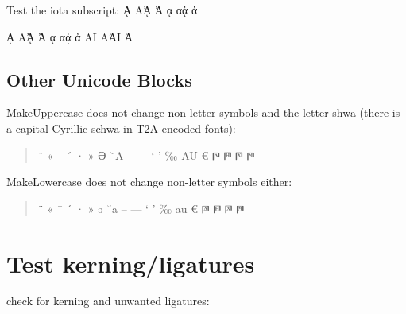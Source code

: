 \documentclass[a4paper]{article}
\begin{document}
\textlatin{Test the iota subscript:}
\textAlpha\prosgegrammeni ᾼ Α\prosgegrammeni  ᾈ Ἀ\prosgegrammeni 
\MakeLowercase{\textAlpha\prosgegrammeni ᾼ Α\prosgegrammeni  ᾈ
					Ἀ\prosgegrammeni}

\textAlpha\ypogegrammeni ᾼ Α\ypogegrammeni  ᾈ Ἀ\ypogegrammeni 
\MakeLowercase{\textAlpha\ypogegrammeni ᾼ Α\ypogegrammeni  ᾈ
					Ἀ\ypogegrammeni}
\MakeUppercase{\textAlpha\ypogegrammeni ᾼ Α\ypogegrammeni  ᾈ
					Ἀ\ypogegrammeni}



\subsection{Other Unicode Blocks}

MakeUppercase does not change non-letter symbols and the letter shwa
(there is a capital Cyrillic schwa in T2A encoded fonts):
\begin{quote}
  \greekscript
  \MakeUppercase{¨ « ¯ ´ · »}
  \MakeUppercase{ə}
  \MakeUppercase{˘a}
  \MakeUppercase{– — ‘ ’ ‰ a‌u}
  \MakeUppercase{€}
  \MakeUppercase{
  𐅄 %
  𐅅 %
  𐅆 %
  𐅇 %
  }
\end{quote}
MakeLowercase does not change non-letter symbols either:
\begin{quote}
  \greekscript
  \MakeLowercase{¨ « ¯ ´ · »}
  \MakeLowercase{ə}
  \MakeLowercase{˘A}
  \MakeLowercase{– — ‘ ’ ‰ A‌‌U}
  \MakeLowercase{€}
  \MakeLowercase{
  𐅄 %
  𐅅 %
  𐅆 %
  𐅇 %
  }
\end{quote}

\section{Test kerning/ligatures}


check for kerning and unwanted ligatures:
\end{document}
